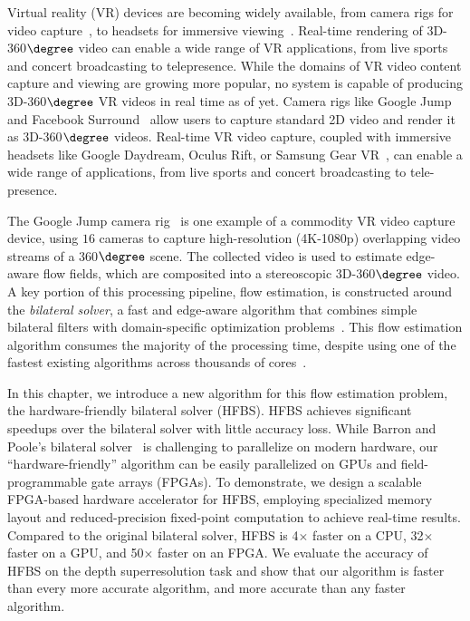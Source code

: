 Virtual reality (VR) devices are becoming widely available, from camera rigs for video capture~\cite{googlejump, facebooksurround}, to headsets for immersive viewing~\cite{oculusrift, gearvr}.
Real-time rendering of 3D-360$\degree$ video can enable a wide range of VR applications, from live sports and concert broadcasting to telepresence.
While the domains of VR video content capture and viewing are growing more popular, no system is capable of producing 3D-360$\degree$ VR videos in real time as of yet.
Camera rigs like Google Jump and Facebook Surround~\cite{googlejump} allow users to capture standard 2D video and render it as 3D-360$\degree$ videos.
Real-time VR video capture, coupled with immersive headsets like Google Daydream, Oculus Rift, or Samsung Gear VR~\cite{googlecardboard, gearvr, oculusrift}, can enable a wide range of applications, from live sports and concert broadcasting to tele-presence.

The Google Jump camera rig~\cite{googlejump} is one example of a commodity VR video capture device, using $16$ cameras to capture high-resolution (4K-1080p) overlapping video streams of a 360$\degree$ scene.
The collected video is used to estimate edge-aware flow fields, which are composited into a stereoscopic 3D-360$\degree$ video.
A key portion of this processing pipeline, flow estimation, is constructed around the \emph{bilateral solver}, a fast and edge-aware algorithm that combines simple bilateral filters with domain-specific optimization problems~\cite{BarronPoole2016}.
This flow estimation algorithm consumes the majority of the processing time, despite using one of the fastest existing algorithms across thousands of cores~\cite{googlejump}.


In this chapter, we introduce a new algorithm for this flow estimation problem, the hardware-friendly bilateral solver (HFBS).
HFBS achieves significant speedups over the bilateral solver with little accuracy loss.
While Barron and Poole's bilateral solver~\cite{BarronPoole2016} is challenging to parallelize on modern hardware, our ``hardware-friendly'' algorithm can be easily parallelized on GPUs and field-programmable gate arrays (FPGAs).
To demonstrate, we design a scalable FPGA-based hardware accelerator for HFBS, employing specialized memory layout and reduced-precision fixed-point computation to achieve real-time results.
Compared to the original bilateral solver, HFBS is 4$\times$ faster on a CPU, 32$\times$ faster on a GPU, and 50$\times$ faster on an FPGA.
We evaluate the accuracy of HFBS on the depth superresolution task and show that our algorithm is faster than every more accurate algorithm, and more accurate than any faster algorithm.

